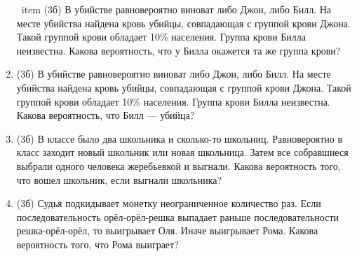 \documentclass[a4paper, 12pt]{article}
\begin{document}
\begin{enumerate}
\
item (3б) В убийстве равновероятно виноват либо Джон, либо Билл. На месте убийства найдена кровь убийцы, совпадающая с группой крови Джона. 
Такой группой крови обладает 10\% населения. Группа крови Билла неизвестна. Какова вероятность, что у Билла окажется та же группа крови?
\item (3б) В убийстве равновероятно виноват либо Джон, либо Билл. На месте убийства найдена кровь убийцы, совпадающая с группой крови Джона. 
Такой группой крови обладает 10\% населения. Группа крови Билла неизвестна. Какова вероятность, что Билл — убийца? 
\item (3б) В классе было два школьника и сколько-то школьниц. Равновероятно в класс заходит новый школьник или новая школьница. 
Затем все собравшиеся выбрали одного человека жеребьевкой и выгнали. Какова вероятность того, что вошел школьник, если выгнали школьника?
\item (3б) Судья подкидывает монетку неограниченное количество раз. Если последовательность орёл-орёл-решка выпадает раньше
последовательности решка-орёл-орёл, то выигрывает Оля. Иначе выигрывает Рома. Какова вероятность того, что Рома выиграет?
\end{enumerate}
\end{document}
